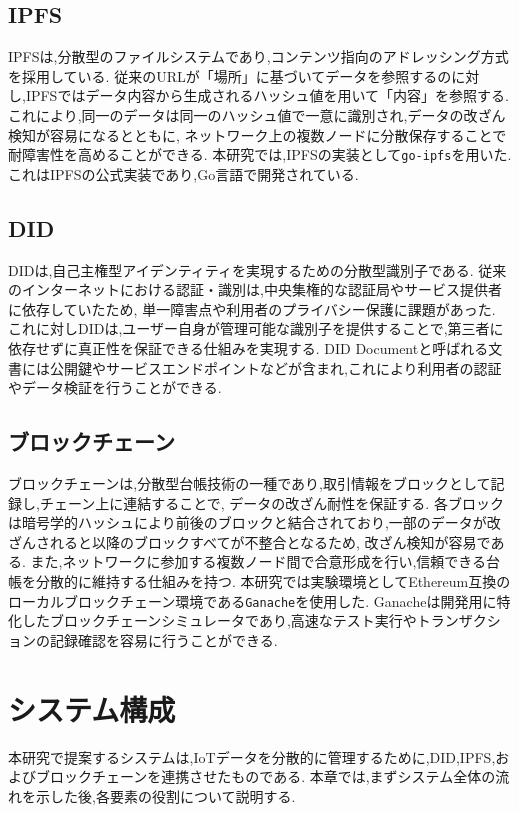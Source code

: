 \documentclass[a4paper,9pt,twocolumn]{ltjsarticle} %
\begin{document}
\subsection{IPFS}
IPFSは,分散型のファイルシステムであり,コンテンツ指向のアドレッシング方式を採用している.
従来のURLが「場所」に基づいてデータを参照するのに対し,IPFSではデータ内容から生成されるハッシュ値を用いて「内容」を参照する.
これにより,同一のデータは同一のハッシュ値で一意に識別され,データの改ざん検知が容易になるとともに,
ネットワーク上の複数ノードに分散保存することで耐障害性を高めることができる.
本研究では,IPFSの実装として\texttt{go-ipfs}を用いた.
これはIPFSの公式実装であり,Go言語で開発されている.

\subsection{DID}
DIDは,自己主権型アイデンティティを実現するための分散型識別子である.
従来のインターネットにおける認証・識別は,中央集権的な認証局やサービス提供者に依存していたため,
単一障害点や利用者のプライバシー保護に課題があった.
これに対しDIDは,ユーザー自身が管理可能な識別子を提供することで,第三者に依存せずに真正性を保証できる仕組みを実現する.
DID Documentと呼ばれる文書には公開鍵やサービスエンドポイントなどが含まれ,これにより利用者の認証やデータ検証を行うことができる.

\subsection{ブロックチェーン}
ブロックチェーンは,分散型台帳技術の一種であり,取引情報をブロックとして記録し,チェーン上に連結することで,
データの改ざん耐性を保証する.
各ブロックは暗号学的ハッシュにより前後のブロックと結合されており,一部のデータが改ざんされると以降のブロックすべてが不整合となるため,
改ざん検知が容易である.
また,ネットワークに参加する複数ノード間で合意形成を行い,信頼できる台帳を分散的に維持する仕組みを持つ.
本研究では実験環境としてEthereum互換のローカルブロックチェーン環境である\texttt{Ganache}を使用した.
Ganacheは開発用に特化したブロックチェーンシミュレータであり,高速なテスト実行やトランザクションの記録確認を容易に行うことができる.

\section{システム構成}
本研究で提案するシステムは,IoTデータを分散的に管理するために,DID,IPFS,およびブロックチェーンを連携させたものである.
本章では,まずシステム全体の流れを示した後,各要素の役割について説明する.
\end{document}
